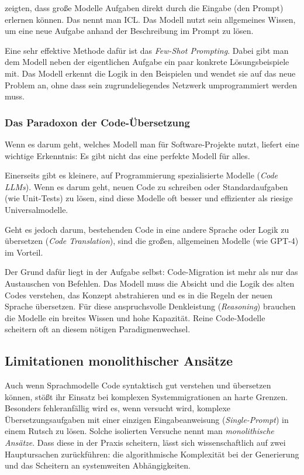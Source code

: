 \textcite{brownLanguageModelsAre2020} zeigten, dass große Modelle Aufgaben direkt durch die Eingabe (den Prompt) erlernen können. Das nennt man \ac{ICL}. Das Modell nutzt sein allgemeines Wissen, um eine neue Aufgabe anhand der Beschreibung im Prompt zu lösen.

Eine sehr effektive Methode dafür ist das \textit{Few-Shot Prompting}. Dabei gibt man dem Modell neben der eigentlichen Aufgabe ein paar konkrete Lösungsbeispiele mit. Das Modell erkennt die Logik in den Beispielen und wendet sie auf das neue Problem an, ohne dass sein zugrundeliegendes Netzwerk umprogrammiert werden muss.

\subsubsection{Das Paradoxon der Code-Übersetzung}
Wenn es darum geht, welches Modell man für Software-Projekte nutzt, liefert \textcite{zhengSurveyLargeLanguage2023} eine wichtige Erkenntnis: Es gibt nicht das eine perfekte Modell für alles.

Einerseits gibt es kleinere, auf Programmierung spezialisierte Modelle (\textit{Code LLMs}). Wenn es darum geht, neuen Code zu schreiben oder Standardaufgaben (wie Unit-Tests) zu lösen, sind diese Modelle oft besser und effizienter als riesige Universalmodelle.

Geht es jedoch darum, bestehenden Code in eine andere Sprache oder Logik zu übersetzen (\textit{Code Translation}), sind die großen, allgemeinen Modelle (wie GPT-4) im Vorteil.

Der Grund dafür liegt in der Aufgabe selbst: Code-Migration ist mehr als nur das Austauschen von Befehlen. Das Modell muss die Absicht und die Logik des alten Codes verstehen, das Konzept abstrahieren und es in die Regeln der neuen Sprache übersetzen. Für diese anspruchsvolle Denkleistung (\textit{Reasoning}) brauchen die Modelle ein breites Wissen und hohe Kapazität. Reine Code-Modelle scheitern oft an diesem nötigen Paradigmenwechsel.

\subsection{Limitationen monolithischer Ansätze}
\label{subsec:limitationen_monolithischer_ansaetze}

Auch wenn Sprachmodelle Code syntaktisch gut verstehen und übersetzen können, stößt ihr Einsatz bei komplexen Systemmigrationen an harte Grenzen. Besonders fehleranfällig wird es, wenn versucht wird, komplexe Übersetzungsaufgaben mit einer einzigen Eingabeanweisung (\textit{Single-Prompt}) in einem Rutsch zu lösen. Solche isolierten Versuche nennt man \textit{monolithische Ansätze}. Dass diese in der Praxis scheitern, lässt sich wissenschaftlich auf zwei Hauptursachen zurückführen: die algorithmische Komplexität bei der Generierung und das Scheitern an systemweiten Abhängigkeiten.  

